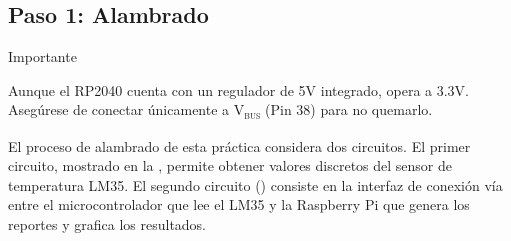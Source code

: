 %
%



\subsection{Paso 1: Alambrado}%
\label{sec:step1}
\begin{importantbox}{\large Importante}
	\begin{center}
		Aunque el RP2040 cuenta con un regulador de 5V integrado, opera a 3.3V. Asegúrese de conectar \VCC únicamente a V\textsubscript{\textsc{bus}} (Pin 38) para no quemarlo.
	\end{center}
\end{importantbox}
\medskip


El proceso de alambrado de esta práctica considera dos circuitos.
El primer circuito, mostrado en la , permite obtener valores discretos del sensor de temperatura LM35.
El segundo circuito () consiste en la interfaz de conexión vía \IIC entre el microcontrolador que lee el LM35 y la Raspberry Pi que genera los reportes y grafica los resultados.

